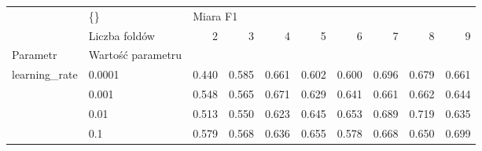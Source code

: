 \begin{tabular}{llrrrrrrrr}
\hline
              & \{\} & \multicolumn{8}{l}{Miara F1} \\
              & Liczba foldów &        2 &      3 &      4 &      5 &      6 &      7 &      8 &      9 \\
Parametr & Wartość parametru &          &        &        &        &        &        &        &        \\
\hline
learning\_rate & 0.0001 &    0.440 &  0.585 &  0.661 &  0.602 &  0.600 &  0.696 &  0.679 &  0.661 \\
              & 0.001 &    0.548 &  0.565 &  0.671 &  0.629 &  0.641 &  0.661 &  0.662 &  0.644 \\
              & 0.01 &    0.513 &  0.550 &  0.623 &  0.645 &  0.653 &  0.689 &  0.719 &  0.635 \\
              & 0.1 &    0.579 &  0.568 &  0.636 &  0.655 &  0.578 &  0.668 &  0.650 &  0.699 \\
\hline
\end{tabular}
